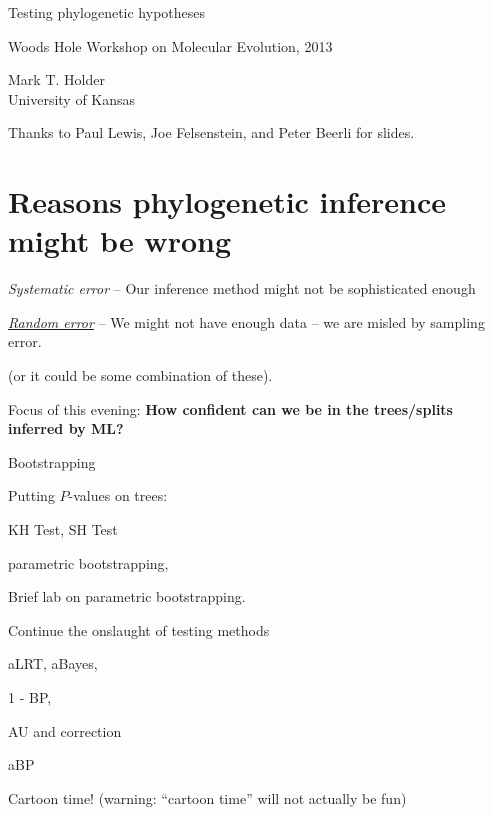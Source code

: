 \documentclass[landscape]{foils}
\begin{document}
\myNewSlide
\huge 
{\begin{center}Testing phylogenetic hypotheses\end{center}}
\vskip 3cm
\large Woods Hole Workshop on Molecular Evolution, 2013\par 
\vskip 3cm
\normalsize
\normalsize
Mark T. Holder\\
University of Kansas\par 
\vskip 1cm
Thanks to Paul Lewis, Joe Felsenstein, and Peter Beerli for slides.

\myNewSlide
\section*{Reasons phylogenetic inference might be wrong}
\Large
\begin{compactenum}
	\item {\em Systematic error} -- Our inference method might not be sophisticated enough
	\item \underline{{\em Random error}} -- We might not have enough data --  we are misled by sampling error.
\end{compactenum}

(or it could be some combination of these).

{Focus of this evening: {\bf How confident can we be in the trees/splits inferred by ML?}}

\myNewSlide
\begin{compactenum}
	\item Bootstrapping
	\item Putting $P$-values on trees:
	\begin{compactitem}
		\item KH Test, SH Test
		\item parametric bootstrapping,
	\end{compactitem}
	\item Brief lab on parametric bootstrapping.
	\item Continue the onslaught of testing methods
	\begin{compactitem}
		\item aLRT, aBayes,
		\item 1 - BP,
		\item AU and \citet{EfronHH1996} correction
		\item aBP
	\end{compactitem}
	\item Cartoon time! ({\small warning: ``cartoon time'' will not actually be fun})
\end{compactenum}
\end{document}
